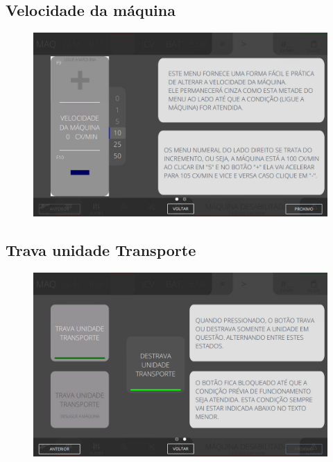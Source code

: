 \thispagestyle{fancy}
\vspace*{40 pt}
\subsection{Velocidade da máquina}
\vspace*{\fill}
\begin{figure}[h]
    \centering
    \includegraphics[width=480 px,height=300 px]{src/imagesICV/05-transport/commands/e-1.png}
\end{figure}
\vspace*{\fill}

\newpage
\thispagestyle{fancy}
\vspace*{40 pt}
\subsection{Trava unidade Transporte}
\vspace*{\fill}
\begin{figure}[h]
    \centering
    \includegraphics[width=576 px,height=360 px]{src/imagesICV/05-transport/commands/e-2.png}
\end{figure}
\vspace*{\fill}